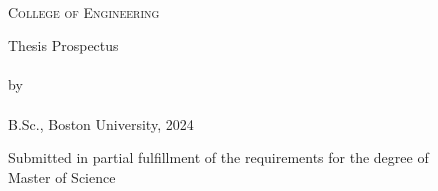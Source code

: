 
\begin{titlepage}
    \begin{center}
        \begin{doublespace}
             \\
            \textsc{\Large College of Engineering} \\
        \end{doublespace}
        \vfill
        {\large Thesis Prospectus}\\
        \vfill
        \textbf{\textsc{\huge\thesisName}} \\
        \vfill
        by \\
        \vfill
        \textbf{\LARGE\authorName} \\ \vspace{2.5pt}
        {\Large B.Sc., Boston University, 2024} \\
        \vfill
        \begin{doublespace}
            Submitted in partial fulfillment of the requirements for the degree of\\
            Master of Science\\
            \the\year
        \end{doublespace}
    \end{center}
\end{titlepage}